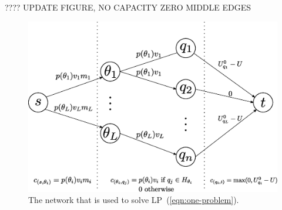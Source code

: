 \documentclass{article}
\begin{document}
???? UPDATE FIGURE, NO CAPACITY ZERO MIDDLE EDGES
\begin{figure}
\caption{The network that is used to solve LP~(\ref{eqn:one-problem}).}
\label{fig:network}
\includegraphics[width=\linewidth]{network}
\end{figure}
\end{document}
